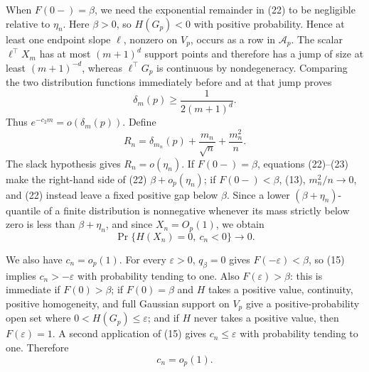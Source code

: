 When \(F(0-)=\beta\), we need the exponential remainder in (22) to be negligible relative to \(\eta_n\).  Here \(\beta>0\), so \(H(G_p)<0\) with positive probability.  Hence at least one endpoint slope \(\ell\), nonzero on \(V_p\), occurs as a row in \(\mathcal A_p\).  The scalar \(\ell^{\top}X_m\) has at most \((m+1)^d\) support points and therefore has a jump of size at least \((m+1)^{-d}\), whereas \(\ell^{\top}G_p\) is continuous by nondegeneracy.  Comparing the two distribution functions immediately before and at that jump proves
\[
\delta_m(p)\geq\frac{1}{2(m+1)^d}.
\tag{23}
\]
Thus \(e^{-c_2m}=o(\delta_m(p))\).  Define
\[
R_n=\delta_{m_n}(p)+\frac{m_n}{\sqrt n}+\frac{m_n^2}{n}.
\]
The slack hypothesis gives \(R_n=o(\eta_n)\).  If \(F(0-)=\beta\), equations (22)--(23) make the right-hand side of (22) \(\beta+o_p(\eta_n)\); if \(F(0-)<\beta\), (13), \(m_n^2/n\to0\), and (22) instead leave a fixed positive gap below \(\beta\).  Since a lower \((\beta+\eta_n)\)-quantile of a finite distribution is nonnegative whenever its mass strictly below zero is less than \(\beta+\eta_n\), and since \(X_n=O_p(1)\), we obtain
\[
\Pr\{H(X_n)=0,\ c_n<0\}\longrightarrow0.
\tag{23a}
\]

We also have \(c_n=o_p(1)\).  For every \(\varepsilon>0\), \(q_\beta=0\) gives \(F(-\varepsilon)<\beta\), so (15) implies \(c_n> -\varepsilon\) with probability tending to one.  Also \(F(\varepsilon)>\beta\): this is immediate if \(F(0)>\beta\); if \(F(0)=\beta\) and \(H\) takes a positive value, continuity, positive homogeneity, and full Gaussian support on \(V_p\) give a positive-probability open set where \(0<H(G_p)\leq\varepsilon\); and if \(H\) never takes a positive value, then \(F(\varepsilon)=1\).  A second application of (15) gives \(c_n\leq\varepsilon\) with probability tending to one.  Therefore
\[
c_n=o_p(1).
\tag{23b}
\]

